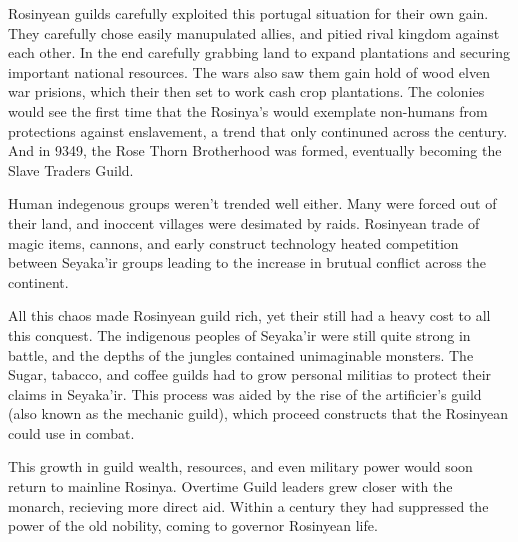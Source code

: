 \documentclass[../main.tex]{subfiles}
\begin{document}
Rosinyean guilds carefully exploited this portugal situation for their own gain.
They carefully chose easily manupulated allies, and pitied rival kingdom against 
each other. In the end carefully grabbing land to expand plantations and securing 
important national resources. The wars also saw them gain hold of wood elven war 
prisions, which their then set to work cash crop plantations. The colonies would
see the first time that the Rosinya's would exemplate non-humans from protections 
against enslavement, a trend that only continuned across the century. And in 9349,
the Rose Thorn Brotherhood was formed, eventually becoming the Slave Traders Guild. 

Human indegenous groups weren't trended well either. Many were forced out of their 
land, and inoccent villages were desimated by raids. Rosinyean trade of magic items,
cannons, and early construct technology heated competition between Seyaka'ir groups 
leading to the increase in brutual conflict across the continent. 

All this chaos made Rosinyean guild rich, yet their still had a heavy cost to all
this conquest. The indigenous peoples of Seyaka'ir were still quite strong in 
battle, and the depths of the jungles contained unimaginable monsters. The Sugar, 
tabacco, and coffee guilds had to grow personal militias to protect their claims 
in Seyaka'ir. This process was aided by the rise of the artificier's guild (also
known as the mechanic guild), which proceed constructs that the Rosinyean could 
use in combat. 

This growth in guild wealth, resources, and even military power would soon return 
to mainline Rosinya. Overtime Guild leaders grew closer with the monarch, recieving
more direct aid. Within a century they had suppressed the power of the old nobility,
coming to governor Rosinyean life.  

\subsubsection{ }

\end{document}
